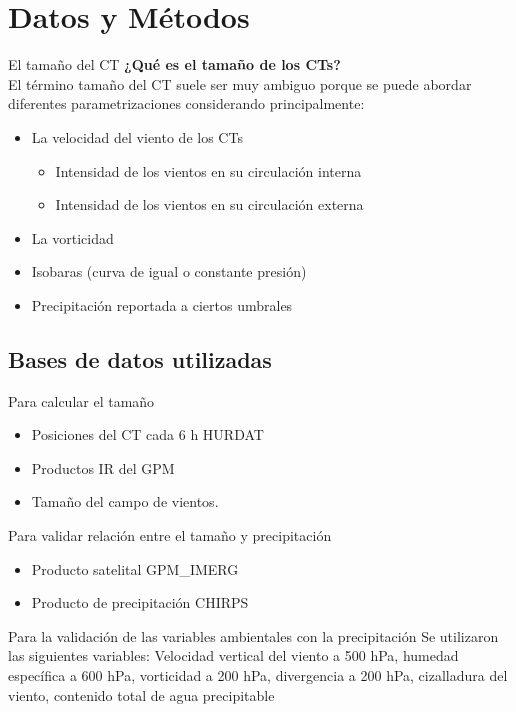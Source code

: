 \section{Datos y Métodos}

\begin{frame}{El tamaño del CT}
\textbf{¿Qué es el tamaño de los CTs?} \\ El término tamaño del CT suele ser muy ambiguo porque se puede abordar diferentes parametrizaciones considerando principalmente:
\begin{itemize}
    \item La velocidad del viento de los CTs
    \begin{itemize}
        \item Intensidad de los vientos en su circulación interna
        \item Intensidad de los vientos en su circulación externa
    \end{itemize}
    \item La vorticidad
    \item Isobaras (curva de igual o constante presión)
    \item Precipitación reportada a ciertos umbrales
\end{itemize}

\end{frame}

\subsection{Bases de datos utilizadas}
\begin{frame}
    \begin{block}{Para calcular el tamaño}
        \begin{itemize}
            \item Posiciones del CT cada 6 h HURDAT
            \item Productos IR del GPM
            \item Tamaño del campo de vientos.
        \end{itemize}
    \end{block}

    \begin{exampleblock}{Para validar relación entre el tamaño y precipitación}
        \begin{itemize}
            \item Producto satelital GPM\_IMERG
            \item Producto de precipitación CHIRPS
        \end{itemize}
    \end{exampleblock}

    \begin{alertblock}{Para la validación de las variables ambientales con la precipitación}
    Se utilizaron las siguientes variables: 
    Velocidad vertical del viento a 500 hPa, humedad específica a 600 hPa, vorticidad a 200 hPa, divergencia a 200 hPa, cizalladura del viento, contenido total de agua precipitable
    \end{alertblock}
\end{frame}


